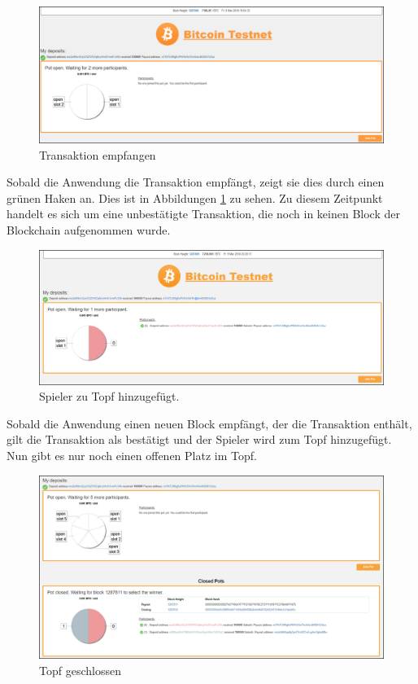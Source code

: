 \begin{figure}[H]
\centering
\includegraphics[width=1\linewidth]{Figures/btc_gui/pot_open_payment_received}
\decoRule
\caption{Transaktion empfangen}
\label{fig:pot_open_payment_received}
\end{figure}

Sobald die Anwendung die Transaktion empfängt, zeigt sie dies durch einen grünen Haken an. Dies ist in Abbildungen \ref{fig:pot_open_payment_received} zu sehen. Zu diesem Zeitpunkt handelt es sich um eine unbestätigte Transaktion, die noch in keinen Block der Blockchain aufgenommen wurde.

\begin{figure}[H]
\centering
\includegraphics[width=1\linewidth]{Figures/btc_gui/pot_open_p1_confirmed}
\decoRule
\caption{Spieler zu Topf hinzugefügt.}
\label{fig:pot_open_p1_confirmed}
\end{figure}
Sobald die Anwendung einen neuen Block empfängt, der die Transaktion enthält, gilt die Transaktion als bestätigt und der Spieler wird zum Topf hinzugefügt. Nun gibt es nur noch einen offenen Platz im Topf.

\begin{figure}[H]
\centering
\includegraphics[width=1\linewidth]{Figures/btc_gui/pot_closed}
\decoRule
\caption{Topf geschlossen}
\label{fig:pot_closed}
\end{figure}

